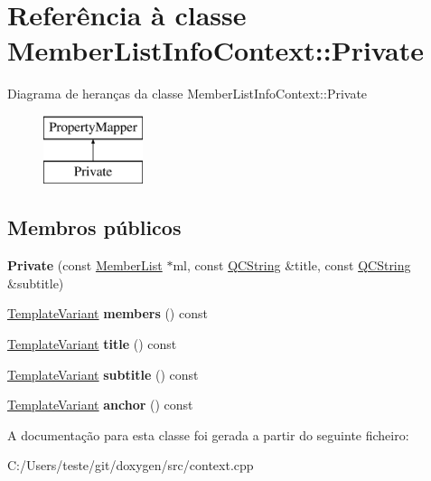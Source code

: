 \hypertarget{class_member_list_info_context_1_1_private}{\section{Referência à classe Member\-List\-Info\-Context\-:\-:Private}
\label{class_member_list_info_context_1_1_private}
}
Diagrama de heranças da classe Member\-List\-Info\-Context\-:\-:Private\begin{figure}[H]
\begin{center}
\leavevmode
\includegraphics[height=2.000000cm]{class_member_list_info_context_1_1_private}
\end{center}
\end{figure}
\subsection*{Membros públicos}
\begin{DoxyCompactItemize}
\item 
\hypertarget{class_member_list_info_context_1_1_private_a2d19083069964a07433bd2589e20367f}{{\bfseries Private} (const \hyperlink{class_member_list}{Member\-List} $\ast$ml, const \hyperlink{class_q_c_string}{Q\-C\-String} \&title, const \hyperlink{class_q_c_string}{Q\-C\-String} \&subtitle)}\label{class_member_list_info_context_1_1_private_a2d19083069964a07433bd2589e20367f}

\item 
\hypertarget{class_member_list_info_context_1_1_private_abafd7644ec4d50bb286695f3c6342956}{\hyperlink{class_template_variant}{Template\-Variant} {\bfseries members} () const }\label{class_member_list_info_context_1_1_private_abafd7644ec4d50bb286695f3c6342956}

\item 
\hypertarget{class_member_list_info_context_1_1_private_a5732df72750a31555da8a10f5788ef02}{\hyperlink{class_template_variant}{Template\-Variant} {\bfseries title} () const }\label{class_member_list_info_context_1_1_private_a5732df72750a31555da8a10f5788ef02}

\item 
\hypertarget{class_member_list_info_context_1_1_private_a41f25c4d24b6522c0bd2e4fd97095610}{\hyperlink{class_template_variant}{Template\-Variant} {\bfseries subtitle} () const }\label{class_member_list_info_context_1_1_private_a41f25c4d24b6522c0bd2e4fd97095610}

\item 
\hypertarget{class_member_list_info_context_1_1_private_ae5fdff7237531f6591c012be117d8089}{\hyperlink{class_template_variant}{Template\-Variant} {\bfseries anchor} () const }\label{class_member_list_info_context_1_1_private_ae5fdff7237531f6591c012be117d8089}

\end{DoxyCompactItemize}


A documentação para esta classe foi gerada a partir do seguinte ficheiro\-:\begin{DoxyCompactItemize}
\item 
C\-:/\-Users/teste/git/doxygen/src/context.\-cpp\end{DoxyCompactItemize}
